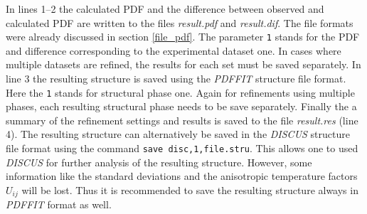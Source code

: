 \noindent In lines 1--2 the calculated PDF and the difference
between observed and calculated PDF are written to the files {\it
result.pdf} and {\it result.dif}. The file formats were already
discussed in section \ref{file_pdf}. The parameter {\tt 1} stands
for the PDF and difference corresponding to the experimental
dataset one. In cases where multiple datasets are refined, the
results for each set must be saved separately. In line 3 the
resulting structure is saved using the {\it PDFFIT} structure file
format. Here the {\tt 1} stands for structural phase one. Again
for refinements using multiple phases, each resulting structural
phase needs to be save separately. Finally the a summary of the
refinement settings and results is saved to the file {\it
result.res} (line 4). The resulting structure can alternatively be
saved in the {\it DISCUS} structure file format using the command
{\tt save disc,1,file.stru}. This allows one to used {\it DISCUS}
for further analysis of the resulting structure. However, some
information like the standard deviations and the anisotropic
temperature factors $U_{ij}$ will be lost. Thus it is recommended
to save the resulting structure always in {\it PDFFIT} format as
well.


